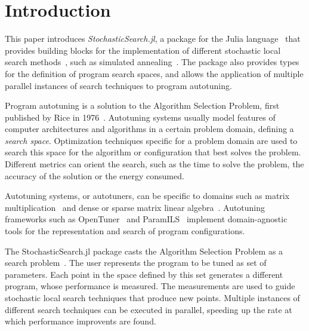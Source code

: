 \section{Introduction}

This paper introduces \textit{StochasticSearch.jl}, a package for the Julia
language~\cite{bezanson2012julia, bezanson2014julia} that provides building
blocks for the implementation of different stochastic local search
methods~\cite{hoos2004stochastic, hoos2015overview}, such as simulated
annealing~\cite{kirkpatrick1983optimization}. The package also provides types
for the definition of program search spaces, and allows the application of
multiple parallel instances of search techniques to program autotuning.

Program autotuning is a solution to the Algorithm Selection Problem, first
published by Rice in 1976~\cite{rice1976algorithm}. Autotuning systems usually
model features of computer architectures and algorithms in a certain problem
domain, defining a \emph{search space}. Optimization techniques specific for a
problem domain are used to search this space for the algorithm or configuration
that best solves the problem. Different metrics can orient the search, such as
the time to solve the problem, the accuracy of the solution or the energy
consumed.  

Autotuning systems, or autotuners, can be specific to domains such as matrix
multiplication~\cite{bilmes1997phipac} and dense or sparse matrix linear
algebra~\cite{whaley1998atlas, vuduc2005oski}.  Autotuning frameworks such as
OpenTuner~\cite{ansel2014opentuner} and ParamILS~\cite{hutter2009paramils}
implement domain-agnostic tools for the representation and search of program
configurations.

The StochasticSearch.jl package casts the Algorithm Selection Problem as a
search problem~\cite{ansel2014opentuner, ansel2014phd}. The user represents the
program to be tuned as set of parameters. Each point in the space defined by
this set generates a different program, whose performance is measured. The
measurements are used to guide stochastic local search techniques that produce
new points.  Multiple instances of different search techniques
can be executed in parallel, speeding up the rate at which performance
improvents are found.
